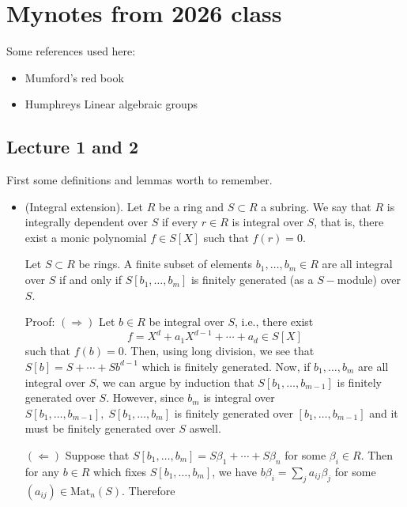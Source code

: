 \chapter{Mynotes from 2026 class}
Some references used here:
\begin{itemize}
    \item Mumford's red book~\cite{mumford1988red}
    \item Humphreys Linear algebraic groups~\cite{humphreys1975linear}
\end{itemize}

\section{Lecture 1 and 2}
First some definitions and lemmas worth to remember.
\begin{itemize}
    \item (Integral extension). Let $R$ be a ring and $S\subset R$ a subring. We say that 
    $R$ is integrally dependent over $S$ if every $r\in R$ is integral over $S$, that is, there 
    exist a monic polynomial $f\in S[X]$ such that $f(r)=0$.
    \begin{lemma}\label{lemma : characterization of integral extensions}
        Let $S\subset R$ be rings. 
        A finite subset of elements $b_1,\dots, b_m\in R$ are all integral over $S$ if and only if 
        $S[b_1,\dots, b_m]$ is finitely generated (as a $S-$module) over $S$.
    \end{lemma}
    Proof: $(\Rightarrow)$ Let $b\in R$ be integral over $S$, i.e., there exist 
    \begin{equation}
     f =    X^d + a_1X^{d-1} +\cdots + a_d \in S[X]
    \end{equation}
    such that $f(b)=0$. Then, using long division, we see that $S[b]=S +\cdots + S b^{d-1}$ which is finitely generated. 
    Now, if $b_1,\dots, b_m$ are all integral over $S$, we can argue by induction that $S[b_1,\dots, b_{m-1}]$ is finitely generated 
    over $S$. However, since $b_m$ is integral over $S[b_1,\dots, b_{m-1}],\;S[b_1,\dots,b_m]$ is finitely generated 
    over $[b_1,\dots, b_{m-1}]$ and it must be finitely generated over $S$ aswell.\par  
    $(\Leftarrow)$ Suppose that $S[b_1,\dots, b_m] = S\beta_1+\cdots+S\beta_n$ for some $\beta_i\in R$. Then for any 
    $b\in R$ which fixes $S[b_1,\dots,b_m]$, we have $b\beta_i= \sum_j a_{ij}\beta_j$ for some $(a_{ij})\in\text{Mat}_n(S)$. 
    Therefore 
    \begin{equation}

\end{equation}
\end{itemize}
